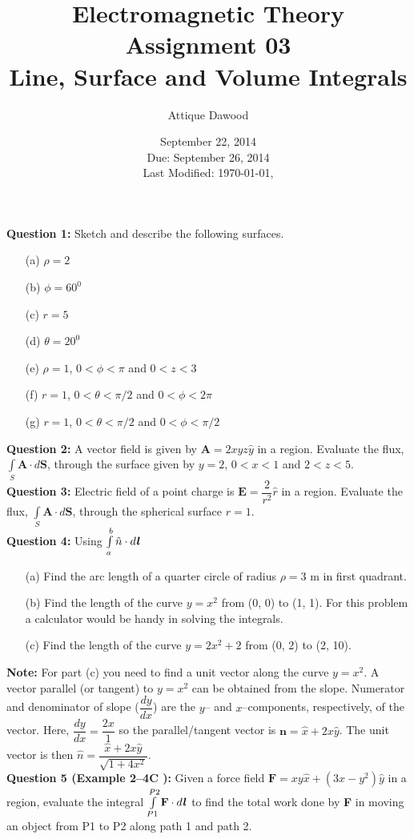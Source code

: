 \documentclass[12pt,a4paper]{article}
\title{Electromagnetic Theory\\Assignment 03\\Line, Surface and Volume Integrals}
\author{Attique Dawood}
\date{September 22, 2014\\Due: September 26, 2014\\[0.2cm] Last Modified: \today, \currenttime}
\begin{document}
\maketitle
\noindent\textbf{Question 1:} Sketch and describe the following surfaces.
\begin{itemize}
\item[(a)] $\rho=2$
\item[(b)] $\phi=60^0$
\item[(c)] $r=5$
\item[(d)] $\theta=20^0$
\item[(e)] $\rho=1$, $0<\phi<\pi$ and $0<z<3$
\item[(f)] $r=1$, $0<\theta<\pi/2$ and $0<\phi<2\pi$
\item[(g)] $r=1$, $0<\theta<\pi/2$ and $0<\phi<\pi/2$
\end{itemize}
\noindent\textbf{Question 2:} A vector field is given by $\textbf{A}=2xyz\hat y$ in a region. Evaluate the flux, $\int\limits_{S}\textbf{A}\cdot d\textbf{S}$, through the surface given by $y=2$, $0<x<1$ and $2<z<5$.\\[0.2cm]
\noindent\textbf{Question 3:} Electric field of a point charge is $\textbf{E}=\dfrac{2}{r^2}\hat r$ in a region. Evaluate the flux, $\int\limits_{S}\textbf{A}\cdot d\textbf{S}$, through the spherical surface $r=1$.\\[0.2cm]
\noindent\textbf{Question 4:} Using $\int\limits_{a}^{b}\hat n\cdot d\textbf{\textit{l}}$
\begin{itemize}
\item[(a)] Find the arc length of a quarter circle of radius $\rho=3$ m in first quadrant.
\item[(b)] Find the length of the curve $y=x^2$ from (0, 0) to (1, 1). For this problem a calculator would be handy in solving the integrals.
\item[(c)] Find the length of the curve $y=2x^2+2$ from (0, 2) to (2, 10).
\end{itemize}
\noindent\textbf{Note:} For part (c) you need to find a unit vector along the curve $y=x^2$. A vector parallel (or tangent) to $y=x^2$ can be obtained from the slope. Numerator and denominator of slope ($\dfrac{dy}{dx}$) are the $y$-- and $x$--components, respectively, of the vector. Here, $\dfrac{dy}{dx}=\dfrac{2x}{1}$ so the parallel/tangent vector is $\textbf{n}=\hat x+2x\hat y$. The unit vector is then $\hat n=\dfrac{\hat x+2x\hat y}{\sqrt{1+4x^2}}$.\\[0.2cm]
\newpage
\noindent\textbf{Question 5 (Example 2--4C \cite[Example 2--4, page 23]{Cheng}):} Given a force field $\textbf{F}=xy\hat x+(3x-y^2)\hat y$ in a region, evaluate the integral $\int\limits_{P1}^{P2}\textbf{F}\cdot d\textbf{\textit{l}}$ to find the total work done by \textbf{F} in moving an object from P1 to P2 along path 1 and path 2.\\[0.2cm]
\end{document}
